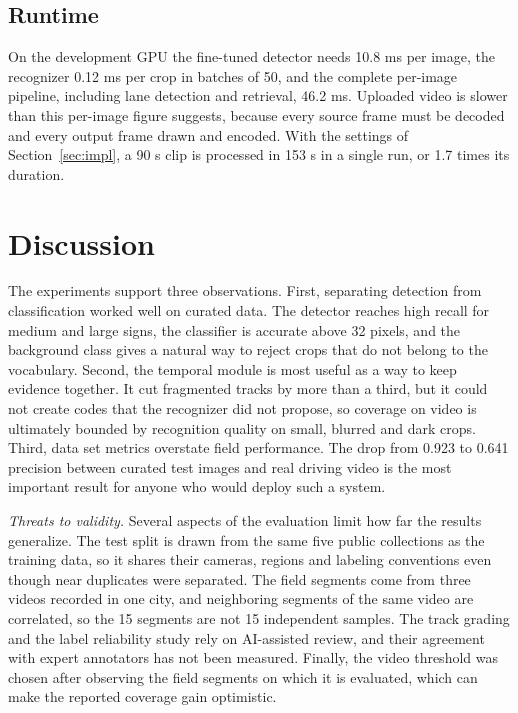 \documentclass[conference,a4paper]{IEEEtran}
\begin{document}
\subsection{Runtime}

On the development GPU the fine-tuned detector needs 10.8 ms per image, the recognizer 0.12 ms per crop in batches of 50, and the complete per-image pipeline, including lane detection and retrieval, 46.2 ms. Uploaded video is slower than this per-image figure suggests, because every source frame must be decoded and every output frame drawn and encoded. With the settings of Section~\ref{sec:impl}, a 90 s clip is processed in 153 s in a single run, or 1.7 times its duration.

\section{Discussion}\label{sec:discussion}

The experiments support three observations. First, separating detection from classification worked well on curated data. The detector reaches high recall for medium and large signs, the classifier is accurate above 32 pixels, and the background class gives a natural way to reject crops that do not belong to the vocabulary. Second, the temporal module is most useful as a way to keep evidence together. It cut fragmented tracks by more than a third, but it could not create codes that the recognizer did not propose, so coverage on video is ultimately bounded by recognition quality on small, blurred and dark crops. Third, data set metrics overstate field performance. The drop from 0.923 to 0.641 precision between curated test images and real driving video is the most important result for anyone who would deploy such a system.

\textit{Threats to validity.} Several aspects of the evaluation limit how far the results generalize. The test split is drawn from the same five public collections as the training data, so it shares their cameras, regions and labeling conventions even though near duplicates were separated. The field segments come from three videos recorded in one city, and neighboring segments of the same video are correlated, so the 15 segments are not 15 independent samples. The track grading and the label reliability study rely on AI-assisted review, and their agreement with expert annotators has not been measured. Finally, the video threshold was chosen after observing the field segments on which it is evaluated, which can make the reported coverage gain optimistic.
\end{document}
